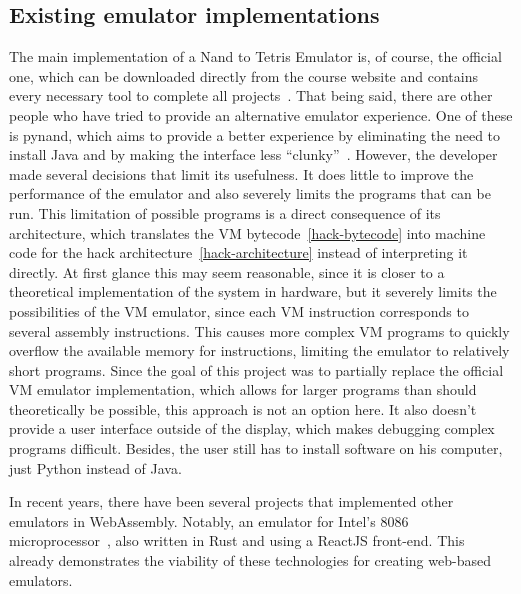 \subsection{Existing emulator implementations}
The main implementation of a Nand to Tetris Emulator is, of course, the official one, which can be downloaded directly from the course website and contains every necessary tool to complete all projects~\cite[Software]{n2tweb}.
\label{pynand}
That being said, there are other people who have tried to provide an alternative emulator experience.
One of these is pynand, which aims to provide a better experience by eliminating the need to install Java and by making the interface less ``clunky''~\cite{pynand}.
However, the developer made several decisions that limit its usefulness.
It does little to improve the performance of the emulator and also severely limits the programs that can be run.
This limitation of possible programs is a direct consequence of its architecture, which translates the VM bytecode~\ref{hack-bytecode} into machine code for the hack architecture~\ref{hack-architecture} instead of interpreting it directly.
At first glance this may seem reasonable, since it is closer to a theoretical implementation of the system in hardware, but it severely limits the possibilities of the VM emulator, since each VM instruction corresponds to several assembly instructions.
This causes more complex VM programs to quickly overflow the available memory for instructions, limiting the emulator to relatively short programs.
Since the goal of this project was to partially replace the official VM emulator implementation, which allows for larger programs than should theoretically be possible, this approach is not an option here.
It also doesn't provide a user interface outside of the display, which makes debugging complex programs difficult. Besides, the user still has to install software on his computer, just Python instead of Java.


In recent years, there have been several projects that implemented other emulators in WebAssembly. Notably, an emulator for Intel's 8086 microprocessor~\cite{9824078}, also written in Rust and using a ReactJS front-end. This already demonstrates the viability of these technologies for creating web-based emulators.

